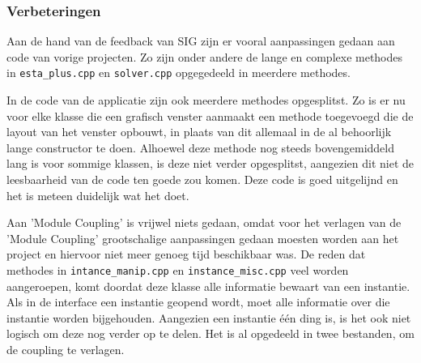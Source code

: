 \subsubsection{Verbeteringen}
Aan de hand van de feedback van SIG zijn er vooral aanpassingen gedaan aan code van vorige projecten. Zo zijn onder andere de lange en complexe methodes in \texttt{esta\_plus.cpp} en \texttt{solver.cpp} opgegedeeld in meerdere methodes. 

In de code van de applicatie zijn ook meerdere methodes opgesplitst. Zo is er nu voor elke klasse die een grafisch venster aanmaakt een methode toegevoegd die de layout van het venster opbouwt, in plaats van dit allemaal in de al behoorlijk lange constructor te doen. Alhoewel deze methode nog steeds bovengemiddeld lang is voor sommige klassen, is deze niet verder opgesplitst, aangezien dit niet de leesbaarheid van de code ten goede zou komen. Deze code is goed uitgelijnd en het is meteen duidelijk wat het doet.

Aan 'Module Coupling' is vrijwel niets gedaan, omdat voor het verlagen van de 'Module Coupling' grootschalige aanpassingen gedaan moesten worden aan het project en hiervoor niet meer genoeg tijd beschikbaar was. De reden dat methodes in \texttt{intance\_manip.cpp} en \texttt{instance\_misc.cpp} veel worden aangeroepen, komt doordat deze klasse alle informatie bewaart van een instantie. Als in de interface een instantie geopend wordt, moet alle informatie over die instantie worden bijgehouden. Aangezien een instantie \'e\'en ding is, is het ook niet logisch om deze nog verder op te delen. Het is al opgedeeld in twee bestanden, om de coupling te verlagen.
